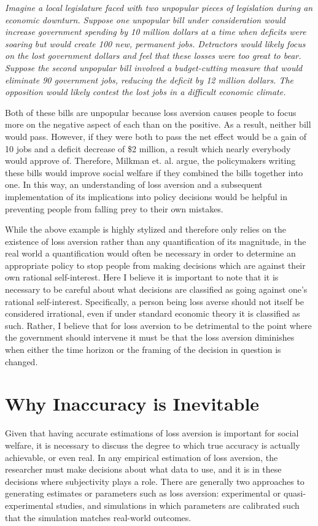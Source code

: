 \documentclass[10pt,twocolumn]{article}
\begin{document}
\textit{Imagine a local legislature faced with two unpopular pieces of legislation during an economic downturn. Suppose one unpopular bill under consideration would increase government spending by 10 million dollars at a time when deficits were soaring but would create 100 new, permanent jobs. Detractors would likely focus on the lost government dollars and feel that these losses were too great to bear. Suppose the second unpopular bill involved a budget-cutting measure that would eliminate 90 government jobs, reducing the deficit by 12 million dollars. The opposition would likely contest the lost jobs in a difficult economic climate.}

Both of these bills are unpopular because loss aversion causes people to focus more on the negative aspect of each than on the positive. As a result, neither bill would pass. However, if they were both to pass the net effect would be a gain of 10 jobs and a deficit decrease of \$2 million, a result which nearly everybody would approve of. Therefore, Milkman et. al. argue, the policymakers writing these bills would improve social welfare if they combined the bills together into one. In this way, an understanding of loss aversion and a subsequent implementation of its implications into policy decisions would be helpful in preventing people from falling prey to their own mistakes. 

While the above example is highly stylized and therefore only relies on the existence of loss aversion rather than any quantification of its magnitude, in the real world a quantification would often be necessary in order to determine an appropriate policy to stop people from making decisions which are against their own rational self-interest. Here I believe it is important to note that it is necessary to be careful about what decisions are classified as going against one's rational self-interest. Specifically, a person being loss averse should not itself be considered irrational, even if under standard economic theory it is classified as such. Rather, I believe that for loss aversion to be detrimental to the point where the government should intervene it must be that the loss aversion diminishes when either the time horizon or the framing of the decision in question is changed. 

\section{Why Inaccuracy is Inevitable}
    Given that having accurate estimations of loss aversion is important for social welfare, it is necessary to discuss the degree to which true accuracy is actually achievable, or even real. In any empirical estimation of loss aversion, the researcher must make decisions about what data to use, and it is in these decisions where subjectivity plays a role. There are generally two approaches to generating estimates or parameters such as loss aversion: experimental or quasi-experimental studies, and simulations in which parameters are calibrated such that the simulation matches real-world outcomes. 
    
\end{document}
